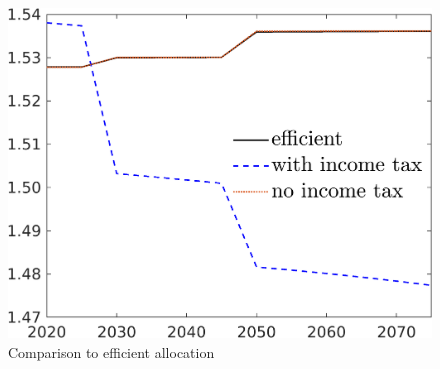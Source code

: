  
 
\begin{figure}[h!!]
	\centering
	\caption{Comparison to efficient allocation }\label{fig:Compno_eff_BN0}
		\begin{minipage}[]{0.32\textwidth}
		\includegraphics[width=1\textwidth]{../../codding_model/own_basedOnFried/optimalPol_elastS_DisuSci/figures/all_1705/hhhl_CompEffOPT_T_NoTaus_spillover0_sep1_BN0_ineq0_red0_etaa0.79_lgd1.png}
	\end{minipage}
	\begin{minipage}[]{0.32\textwidth}

\end{minipage}
\end{figure}
